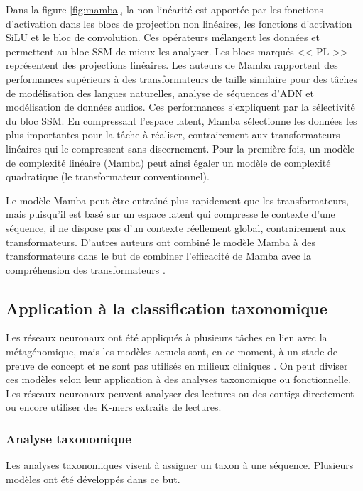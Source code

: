 Dans la figure \ref{fig:mamba}, la non linéarité est apportée par les fonctions d'activation dans
les blocs de projection non linéaires, les fonctions d'activation SiLU et le bloc de convolution.
Ces opérateurs mélangent les données et permettent au bloc SSM de mieux les analyser. Les blocs
marqués << PL >> représentent des projections linéaires. Les auteurs de Mamba \cite{gu2024}
rapportent des performances supérieurs à des transformateurs de taille similaire pour des tâches de
modélisation des langues naturelles, analyse de séquences d'ADN et modélisation de données audios.
Ces performances s'expliquent par la sélectivité du bloc SSM. En compressant l'espace latent, Mamba
sélectionne les données les plus importantes pour la tâche à réaliser, contrairement aux
transformateurs linéaires qui le compressent sans discernement. Pour la première fois, un modèle de
complexité linéaire (Mamba) peut ainsi égaler un modèle de complexité quadratique (le transformateur
conventionnel).

Le modèle Mamba peut être entraîné plus rapidement que les transformateurs, mais puisqu'il est basé
sur un espace latent qui compresse le contexte d'une séquence, il ne dispose pas d'un contexte
réellement global, contrairement aux transformateurs. D'autres auteurs ont combiné le modèle Mamba à
des transformateurs dans le but de combiner l'efficacité de Mamba avec la compréhension des
transformateurs \cite{glorioso2024}.

\subsection{Application à la classification taxonomique}
Les réseaux neuronaux ont été appliqués à plusieurs tâches en lien avec la métagénomique, mais les
modèles actuels sont, en ce moment, à un stade de preuve de concept et ne sont pas utilisés en
milieux cliniques \cite{roy2024}. On peut diviser ces modèles selon leur application à des analyses
taxonomique ou fonctionnelle. Les réseaux neuronaux peuvent analyser des lectures ou des contigs
directement ou encore utiliser des K-mers extraits de lectures.

\subsubsection{Analyse taxonomique}
Les analyses taxonomiques visent à assigner un taxon à une séquence. Plusieurs modèles ont été
développés dans ce but.

